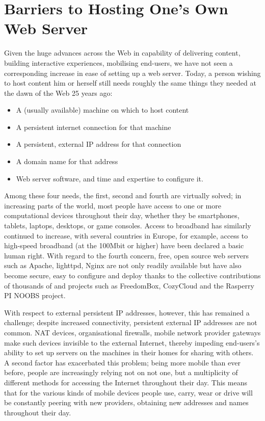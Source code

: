 \documentclass{amsart}
\begin{document}
\section{Barriers to Hosting One's Own Web Server}

Given the huge advances across the Web in capability of delivering content, building interactive experiences, mobilising end-users, we have not seen a corresponding increase in ease of setting up a web server.  Today, a person wishing to host content him or herself still needs roughly the same things they needed at the dawn of the Web 25 years ago:

\begin{itemize}
\item A (usually available) machine on which to host content
\item A persistent internet connection for that machine
\item A persistent, external IP address for that connection
\item A domain name for that address
\item Web server software, and time and expertise to configure it.
\end{itemize}

Among these four needs, the first, second and fourth are virtually solved; in increasing parts of the world, most people have access to one or more computational devices throughout their day, whether they be smartphones, tablets, laptops, desktops, or game consoles.  Access to broadband has similarly continued to increase, with several countries in Europe, for example, access to high-speed broadband (at the 100Mbit or higher) have been declared a basic human right.  With regard to the fourth concern, free, open source web servers such as Apache, lighttpd, Nginx are not only readily available but have also become secure, easy to configure and deploy thanks to the collective contributions of thousands of and projects such as FreedomBox, CozyCloud and the Rasperry PI NOOBS project. 

With respect to external persistent IP addresses, however, this has remained a challenge; despite increased connectivity, persistent external IP addresses are not common.  NAT devices, organisational firewalls, mobile network provider gateways make such devices invisible to the external Internet, thereby impeding end-users's ability to set up servers on the machines in their homes for sharing with others.  A second factor has exacerbated this problem; being more mobile than ever before, people are increasingly relying not on not one, but a multiplicity of different methods for accessing the Internet throughout their day.  This means that for the various kinds of mobile devices people use, carry, wear or drive will be constantly peering with new providers, obtaining new addresses and names throughout their day.
\end{document}
